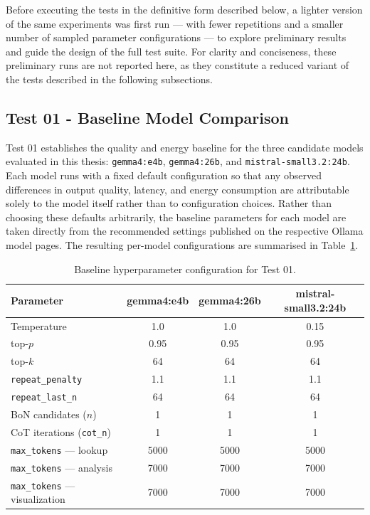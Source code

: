 Before executing the tests in the definitive form described below, a lighter
version of the same experiments was first run --- with fewer repetitions and a
smaller number of sampled parameter configurations --- to explore preliminary
results and guide the design of the full test suite. For clarity and
conciseness, these preliminary runs are not reported here, as they constitute
a reduced variant of the tests described in the following subsections.

\subsection{Test 01 - Baseline Model Comparison}
\label{subsec:test01}

Test 01 establishes the quality and energy baseline for the three candidate
models evaluated in this thesis: \texttt{gemma4:e4b}, \texttt{gemma4:26b}, and
\texttt{mistral-small3.2:24b}. Each model runs with a fixed default
configuration so that any observed differences in output quality, latency, and
energy consumption are attributable solely to the model itself rather than to
configuration choices. Rather than choosing these defaults arbitrarily, the
baseline parameters for each model are taken directly from the recommended
settings published on the respective Ollama model pages. The resulting
per-model configurations are summarised in Table~\ref{tab:test01baseline}.

\begin{table}[H]
\centering
{}
\begin{tabular}{|l|c|c|c|}
\hline
\rowcolor{bluePoli!30}
\textbf{Parameter} & \textbf{gemma4:e4b} & \textbf{gemma4:26b} & \textbf{mistral-small3.2:24b} \T\B \\
\hline
Temperature         & 1.0  & 1.0  & 0.15 \T\B \\
\hline
top-$p$             & 0.95 & 0.95 & 0.95 \T\B \\
\hline
top-$k$             & 64   & 64   & 64   \T\B \\
\hline
\texttt{repeat\_penalty}    & 1.1  & 1.1  & 1.1  \T\B \\
\hline
\texttt{repeat\_last\_n}    & 64   & 64   & 64   \T\B \\
\hline
BoN candidates ($n$)        & 1    & 1    & 1    \T\B \\
\hline
CoT iterations (\texttt{cot\_n}) & 1    & 1    & 1    \T\B \\
\hline
\texttt{max\_tokens} — lookup       & 5000 & 5000 & 5000 \T\B \\
\hline
\texttt{max\_tokens} — analysis     & 7000 & 7000 & 7000 \T\B \\
\hline
\texttt{max\_tokens} — visualization & 7000 & 7000 & 7000 \T\B \\
\hline
\end{tabular}
\caption{Baseline hyperparameter configuration for Test 01.}
\label{tab:test01baseline}
\end{table}

